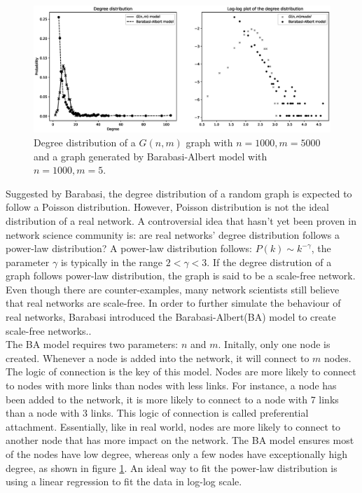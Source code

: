 \documentclass[12pt]{article}
\begin{document}
\begin{figure}[ht]
    \centering
    \includegraphics[width=\textwidth]{degree_distribution.eps}
    \centering
    \caption{Degree distribution of a $G(n,m)$ graph with $n=1000,m=5000$ and a graph generated by Barabasi-Albert model with $n=1000,m=5$.}
    \label{fig:degree_dist}
\end{figure}
\noindent
Suggested by Barabasi\cite{barabási2016network}, the degree distribution of a random graph is expected to follow a Poisson distribution. However, Poisson distribution is not the ideal distribution of a real network. A controversial idea that hasn't yet been proven in network science community is: are real networks' degree distribution follows a power-law distribution?\cite{broido_clauset_2019} A power-law distribution follows: $P(k) \sim k^{-\gamma }$, the parameter $\gamma$ is typically in the range $2<\gamma<3$. If the degree distrution of a graph follows power-law distribution, the graph is said to be a scale-free network. Even though there are counter-examples, many network scientists still believe that real networks are scale-free. In order to further simulate the behaviour of real networks, Barabasi introduced the Barabasi-Albert(BA) model to create scale-free networks.\cite{barabási2016network}.\\
The BA model requires two parameters: $n$ and $m$. Initally, only one node is created. Whenever a node is added into the network, it will connect to $m$ nodes. The logic of connection is the key of this model. Nodes are more likely to connect to nodes with more links than nodes with less links. For instance, a node has been added to the network, it is more likely to connect to a node with 7 links than a node with 3 links. This logic of connection is called preferential attachment. Essentially, like in real world, nodes are more likely to connect to another node that has more impact on the network. The BA model ensures most of the nodes have low degree, whereas only a few nodes have exceptionally high degree, as shown in figure \ref{fig:degree_dist}. An ideal way to fit the power-law distribution is using a linear regression to fit the data in log-log scale.
\end{document}
